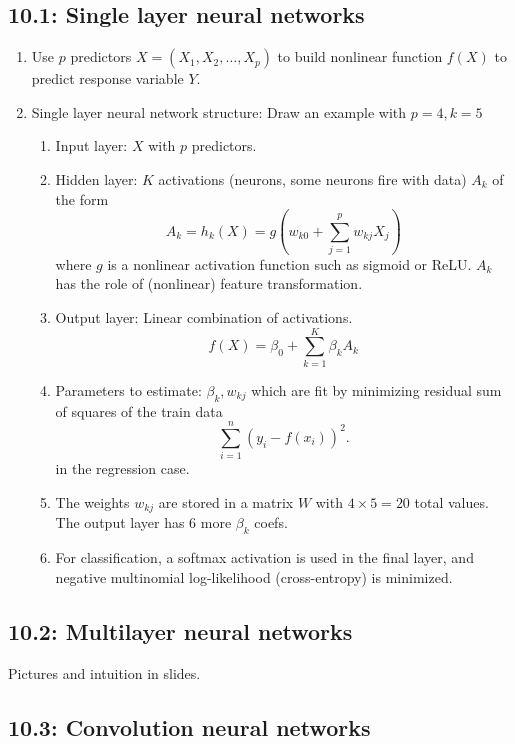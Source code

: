 \documentclass{article}
\begin{document}
\subsection*{10.1: Single layer neural networks}

\begin{enumerate}
\item Use $p$ predictors $X = (X_1, X_2, \dots, X_p)$ to build nonlinear function $f(X)$ to predict response variable $Y$.
\item Single layer neural network structure: Draw an example with $p=4, k=5$
\begin{enumerate}
\item Input layer: $X$ with $p$ predictors.
\item Hidden layer: $K$ activations (neurons, some neurons fire with data) $A_k$ of the form
\[
A_k = h_k(X) = g(w_{k0} + \sum_{j=1}^p w_{kj} X_j)
\] 
where $g$ is a nonlinear activation function such as sigmoid or ReLU. $A_k$ has the role of (nonlinear) feature transformation.
\item Output layer: Linear combination of activations.
\[
f(X) = \beta_0 + \sum_{k=1}^K \beta_k A_k
\]
\item Parameters to estimate: $\beta_k, w_{kj}$ which are fit by minimizing residual sum of squares of the train data
\[
\sum_{i=1}^n (y_i - f(x_i))^2.
\]
in the regression case. 
\item The weights $w_{kj}$ are stored in a matrix $W$ with $4 \times 5 = 20$ total values. The output layer has 6 more $\beta_k$ coefs. 
\item For classification, a softmax activation is used in the final layer, and negative multinomial log-likelihood (cross-entropy) is minimized. 
\end{enumerate}
\end{enumerate}

\subsection*{10.2: Multilayer neural networks}

Pictures and intuition in slides.

\subsection*{10.3: Convolution neural networks}
\end{document}
